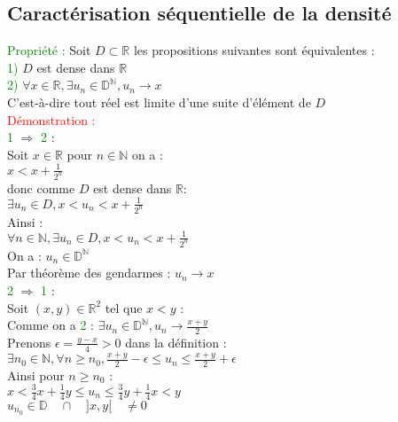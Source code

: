 \documentclass{article}
\begin{document}
\subsection{Caractérisation séquentielle de la densité}
\textcolor{green}{Propriété :} Soit $D \subset \mathbb{R}$ les propositions suivantes sont équivalentes : \\ 
\textcolor{green}{1)} $D$ est dense dans $\mathbb{R}$ \\ 
\textcolor{green}{2)} $\forall x \in \mathbb{R}, \exists u_n \in \mathbb{D}^\mathbb{N},u_n \rightarrow x$ \\ 
C'est-à-dire tout réel est limite d'une suite d'élément de $D$ \\ 
\textcolor{red}{Démonstration :} \\ 
\textcolor{green}{1} $\Rightarrow$ \textcolor{green}{2} : \\ 
Soit $x \in \mathbb{R} $ pour $n \in \mathbb{N} $ on a : \\ 
$x < x+ \frac{1}{2^n}$ \\ 
donc comme $D$ est dense dans $\mathbb{R}$: \\ 
$\exists u_n \in D, x<u_n<x+ \frac{1}{2^n}$ \\ 
Ainsi : \\ 
$\forall n \in \mathbb{N},\exists u_n \in D, x<u_n<x+ \frac{1}{2^n}$ \\ 
On a : $u_n \in \mathbb{D}^{\mathbb{N}}$ \\ 
Par théorème des gendarmes : $u_n \rightarrow x$ \\ 
\textcolor{green}{2} $\Rightarrow$ \textcolor{green}{1} : \\ 
Soit $(x,y) \in \mathbb{R}^2$ tel que $x<y$ : \\ 
Comme on a \textcolor{green}{2} : $\exists u_n \in \mathbb{D}^\mathbb{N},u_n \rightarrow \frac{x+y}{2}$ \\ 
Prenons $\epsilon= \frac{y-x}{4}>0$ dans la définition : \\ 
$\exists n_0 \in \mathbb{N}, \forall n \geq n_0, \frac{x+y}{2}-\epsilon \leq u_n \leq \frac{x+y}{2}+\epsilon$ \\ 
Ainsi pour $n \geq n_0$ : \\ 
$x<\frac{3}{4}x+\frac{1}{4}y\leq u_n \leq \frac{3}{4}y+\frac{1}{4}x<y $ \\ 
$u_{n_0} \in \mathbb{D} \quad \cap \quad ]x,y[  \quad \neq 0$
\end{document}
